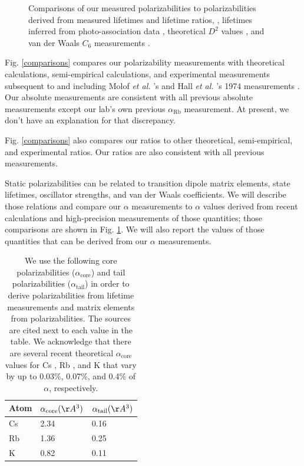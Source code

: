 \documentclass[twocolumn,prl,showpacs,superscriptaddress]{revtex4-1}   %
\newcommand{\figref}[1]{Fig. \ref{#1}}
\newcommand{\arb}{\alpha_{\textrm{Rb}}}
\newcommand{\acore}{\alpha_{\textrm{core}}}
\newcommand{\atail}{\alpha_{\textrm{tail}}}
\newcommand{\etal}{\textit{et al. }}
\begin{document}
\begin{figure}
\caption{\label{comparisonsMisc}Comparisons of our measured polarizabilities to polarizabilities derived from measured lifetimes and lifetime ratios,
\cite{Young1994,Rafac1999,Bouloufa2007,Volz2006,Simsarian1998,Wang1997,Rafac1998}, 
lifetimes inferred from photo-association data
\cite{Gabbanini2000,Gutterres2002},
theoretical $D^2$ values
\cite{Porsev2010},
and van der Waals $C_6$ measurements
\cite{Leo2000,Chin2004,Derevianko2001}.}
\end{figure}

\figref{comparisons} compares our polarizability measurements with theoretical calculations, semi-empirical calculations, and experimental measurements subsequent to and including Molof \etal's and Hall \etal's 1974 measurements \cite{Molof1974,Hall1974}. Our absolute measurements are consistent with all previous absolute measurements except our lab's own previous $\arb$ measurement. At present, we don't have an explanation for that discrepancy.

\figref{comparisons} also compares our ratios to other theoretical, semi-empirical, and experimental ratios. Our ratios are also consistent with all previous measurements.

Static polarizabilities can be related to transition dipole matrix elements, state lifetimes, oscillator strengths, and van der Waals coefficients. We will describe those relations and compare our $\alpha$ measurements to $\alpha$ values derived from recent calculations and high-precision measurements of those quantities; those comparisons are shown in \figref{comparisonsMisc}. We will also report the values of those quantities that can be derived from our $\alpha$ measurements.

\begingroup
\begin{table}
\caption{\label{tableCoreTail}We use the following core polarizabilities ($\acore$) and tail polarizabilities ($\atail$) in order to derive polarizabilities from lifetime measurements and matrix elements from polarizabilities. The sources are cited next to each value in the table. We acknowledge that there are several recent theoretical $\acore$ values for 
Cs \cite{Sansonetti1981,Johnson1983,Safronova1999,Derevianko2001}, 
Rb \cite{Johnson1983,Safronova1999}, and 
K \cite{Johnson1983,Muller1984}
that vary by up to 0.03\%, 0.07\%, and 0.4\% of $\alpha$, respectively.}
\begin{center}
\begin{tabular}{l l l}
\hline\hline
Atom & $\acore (\AA^3)$ & $\atail (\AA^3)$ \\
\hline
Cs & 2.34 \cite{Lim2002} & 0.16 \cite{Derevianko2001} \\
Rb & 1.36 \cite{Lim2002} & 0.25 \cite{Safronova2011} \\
K  & 0.82 \cite{Lim2002} & 0.11 \cite{Sahoo2013} \\
\hline\hline
\end{tabular}
\end{center}
\end{table}
\endgroup
\end{document}
